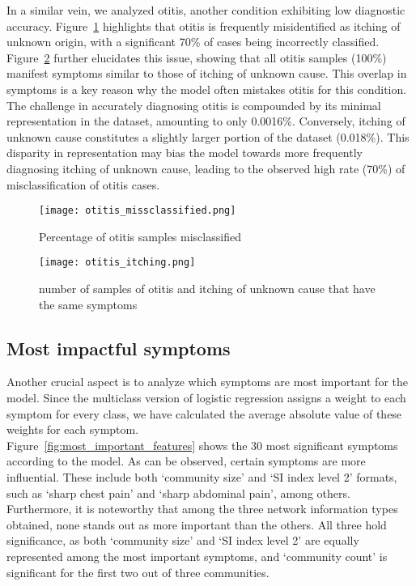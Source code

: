 In a similar vein, we analyzed otitis, another condition exhibiting low diagnostic accuracy.
Figure~\ref{fig:otitis_missclassified} highlights that otitis is frequently misidentified as itching of unknown origin,
with a significant 70\% of cases being incorrectly classified.\\
Figure~\ref{fig:otitis_itching} further elucidates this issue,
showing that all otitis samples (100\%) manifest symptoms similar to those of itching of unknown cause.
This overlap in symptoms is a key reason why the model often mistakes otitis for this condition.\\
The challenge in accurately diagnosing otitis is compounded by its minimal representation in the dataset, amounting to only 0.0016\%.
Conversely, itching of unknown cause constitutes a slightly larger portion of the dataset (0.018\%).
This disparity in representation may bias the model towards more frequently diagnosing itching of unknown cause,
leading to the observed high rate (70\%) of misclassification of otitis cases.
\begin{figure}[H]
	\centering
	\texttt{[image: otitis\_missclassified.png]}
	\caption{Percentage of otitis samples misclassified}\label{fig:otitis_missclassified}
\end{figure}
\noindent
\begin{figure}[H]
	\centering
	\texttt{[image: otitis\_itching.png]}
	\caption{number of samples of otitis and itching of unknown cause that have the same symptoms}\label{fig:otitis_itching}
\end{figure}
\noindent

\subsection*{Most impactful symptoms}
Another crucial aspect is to analyze which symptoms are most important for the model.
Since the multiclass version of logistic regression assigns a weight to each symptom for every class,
we have calculated the average absolute value of these weights for each symptom.\\
Figure~\ref{fig:most_important_features} shows the 30 most significant symptoms according to the model.
As can be observed, certain symptoms are more influential. These include both `community size' and `SI index level 2' formats,
such as `sharp chest pain' and `sharp abdominal pain', among others.\\
Furthermore, it is noteworthy that among the three network information types obtained,
none stands out as more important than the others. All three hold significance,
as both `community size' and `SI index level 2' are equally represented among the most important symptoms,
and `community count' is significant for the first two out of three communities.

